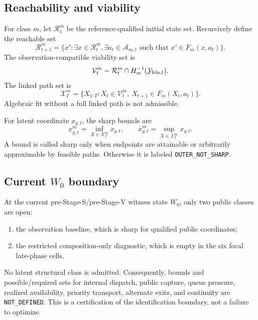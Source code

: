 \documentclass[11pt]{article}
\begin{document}
\subsection{Reachability and viability}

For class $m$, let $\mathcal R^m_1$ be the reference-qualified initial state set. Recursively define the reachable set
\begin{equation}
\mathcal R^m_{t+1}=
\{x':\exists x\in\mathcal R^m_t,\exists a_t\in\mathcal A_{m,t}
\text{ such that }x'\in F_m(x,a_t)\}.
\end{equation}
The observation-compatible viability set is
\begin{equation}
\mathcal V^m_t=\mathcal R^m_t\cap H_m^{-1}(\mathcal Y_{\mathrm{Ida},t}).
\end{equation}
The linked path set is
\begin{equation}
\mathcal X_I^m=
\{X_{1:T}:X_t\in\mathcal V^m_t,\ X_{t+1}\in F_m(X_t,a_t)\}.
\label{eq:pathset}
\end{equation}
Algebraic fit without a full linked path is not admissible.

For latent coordinate $x_{g,t}$, the sharp bounds are
\begin{equation}
\underline x_{g,t}^m=\inf_{X\in\mathcal X_I^m}x_{g,t},
\qquad
\overline x_{g,t}^m=\sup_{X\in\mathcal X_I^m}x_{g,t}.
\end{equation}
A bound is called sharp only when endpoints are attainable or arbitrarily approximable by feasible paths. Otherwise it is labeled \texttt{OUTER\_NOT\_SHARP}.

\subsection{Current \texorpdfstring{$W_0$}{W0} boundary}

At the current pre-Stage-S/pre-Stage-V witness state $W_0$, only two public classes are open:
\begin{enumerate}
\item the observation baseline, which is sharp for qualified public coordinates;
\item the restricted composition-only diagnostic, which is empty in the six focal late-phase cells.
\end{enumerate}
No latent structural class is admitted. Consequently, bounds and possible/required sets for internal dispatch, public capture, queue pressure, realized availability, priority transport, alternate exits, and continuity are \texttt{NOT\_DEFINED}. This is a certification of the identification boundary, not a failure to optimize.
\end{document}
